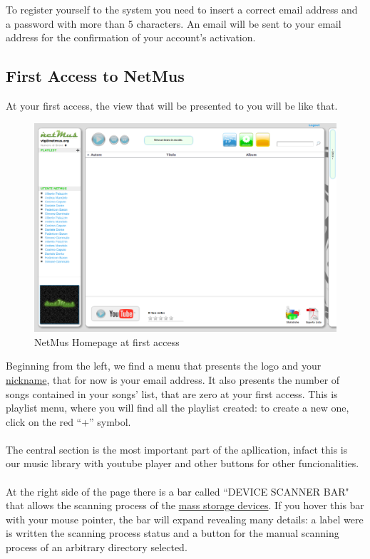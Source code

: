 To register yourself to the system you need to insert a correct email address
and a password with more than 5 characters. An email will be sent to your email
address for the confirmation of your account's activation.

\subsection{First Access to NetMus}

At your first access, the view that will be presented to you will be like that.

\begin{figure}[htbp]
  \centering
  \includegraphics[width=15cm]{img/MU/profile_blank.png}
\caption{NetMus Homepage at first access}
\end{figure}

Beginning from the left, we find a menu that presents the  logo and
your \underline{nickname}, that for now is your email address. It also presents
the number of songs contained in your songs' list, that are zero at your first
access. This is playlist menu, where you will find all the playlist created: 
to create a new one, click on the red ``+'' symbol.\\
\\
The central section is the most important part of the apllication, infact this
is our music library with youtube player and other buttons for other
funcionalities.\\
\\
At the right side of the page there is a bar called ``DEVICE SCANNER BAR" that
allows the scanning process of the \underline{mass storage devices}. If you
hover this bar with your mouse pointer, the bar will expand revealing many details: a label were is
written  the scanning process status and a button for the manual scanning
process of an arbitrary directory selected.\\

